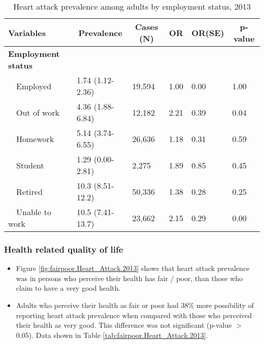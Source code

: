 \begin{table}[H]
\caption{Heart attack prevalence  among adults by employment status, 2013\label{tab:employ.Heart_Attack.2013}} 
\begin{center}
\begin{tabular}{llllll}
\hline\hline
\multicolumn{1}{l}{Variables}&\multicolumn{1}{c}{Prevalence}&\multicolumn{1}{c}{Cases (N)}&\multicolumn{1}{c}{OR}&\multicolumn{1}{c}{OR(SE)}&\multicolumn{1}{c}{p-value}\tabularnewline
\hline
{\bfseries Employment status}&&&&&\tabularnewline
~~Employed&1.74 (1.12-2.36)&19,594&1.00&0.00&1.00\tabularnewline
~~Out of work&4.36 (1.88-6.84)&12,182&2.21&0.39&0.04\tabularnewline
~~Homework&5.14 (3.74-6.55)&26,636&1.18&0.31&0.59\tabularnewline
~~Student&1.29 (0.00-2.81)& 2,275&1.89&0.85&0.45\tabularnewline
~~Retired&10.3 (8.51-12.2)&50,336&1.38&0.28&0.25\tabularnewline
~~Unable to work&10.5 (7.41-13.7)&23,662&2.15&0.29&0.00\tabularnewline
\hline
\end{tabular}\end{center}

\end{table}


 \newpage
\subsubsection{Health related quality of life}


 \begin{itemize}

\item Figure \ref{fig:fairpoor.Heart_Attack.2013} shows that heart attack prevalence  was 
 in persons who perceive their health has fair / poor,
than those who claim to have a very good health.

\item Adults who perceive their health as fair or poor had 38\% more possibility of reporting heart attack prevalence when compared with those who perceived their health as very good. This difference was not significant (p-value $>$ 0.05). Data shown in Table \ref{tab:fairpoor.Heart_Attack.2013}.

\end{itemize}

